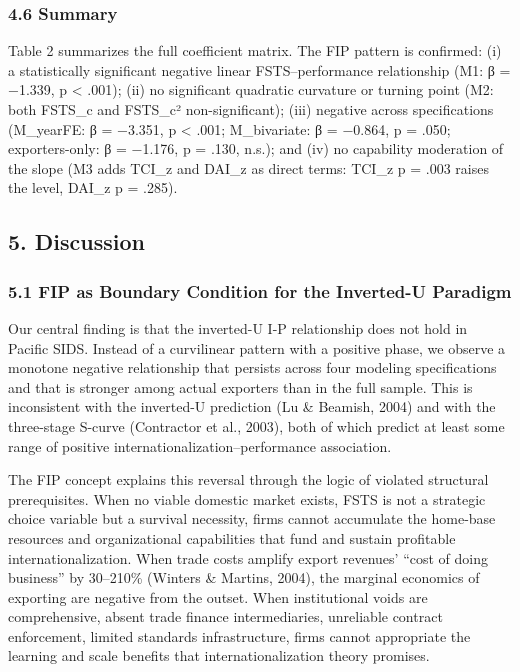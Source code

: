 \documentclass[
  12pt,a4paper]{article}
\begin{document}
\hypertarget{summary}{%
\subsubsection{4.6 Summary}\label{summary}}

Table 2 summarizes the full coefficient matrix. The FIP pattern is
confirmed: (i) a statistically significant negative linear
FSTS--performance relationship (M1: β = −1.339, p \textless{} .001);
(ii) no significant quadratic curvature or turning point (M2: both
FSTS\_c and FSTS\_c² non-significant); (iii) negative across
specifications (M\_yearFE: β = −3.351, p \textless{} .001; M\_bivariate:
β = −0.864, p = .050; exporters-only: β = −1.176, p = .130, n.s.); and
(iv) no capability moderation of the slope (M3 adds TCI\_z and DAI\_z as
direct terms: TCI\_z p = .003 raises the level, DAI\_z p = .285).

\hypertarget{discussion}{%
\subsection{5. Discussion}\label{discussion}}

\hypertarget{fip-as-boundary-condition-for-the-inverted-u-paradigm}{%
\subsubsection{5.1 FIP as Boundary Condition for the Inverted-U
Paradigm}\label{fip-as-boundary-condition-for-the-inverted-u-paradigm}}

Our central finding is that the inverted-U I-P relationship does not
hold in Pacific SIDS. Instead of a curvilinear pattern with a positive
phase, we observe a monotone negative relationship that persists across
four modeling specifications and that is stronger among actual exporters
than in the full sample. This is inconsistent with the inverted-U
prediction (Lu \& Beamish, 2004) and with the three-stage S-curve
(Contractor et al., 2003), both of which predict at least some range of
positive internationalization--performance association.

The FIP concept explains this reversal through the logic of violated
structural prerequisites. When no viable domestic market exists, FSTS is
not a strategic choice variable but a survival necessity, firms cannot
accumulate the home-base resources and organizational capabilities that
fund and sustain profitable internationalization. When trade costs
amplify export revenues' ``cost of doing business'' by 30--210\%
(Winters \& Martins, 2004), the marginal economics of exporting are
negative from the outset. When institutional voids are comprehensive,
absent trade finance intermediaries, unreliable contract enforcement,
limited standards infrastructure, firms cannot appropriate the learning
and scale benefits that internationalization theory promises.
\end{document}
